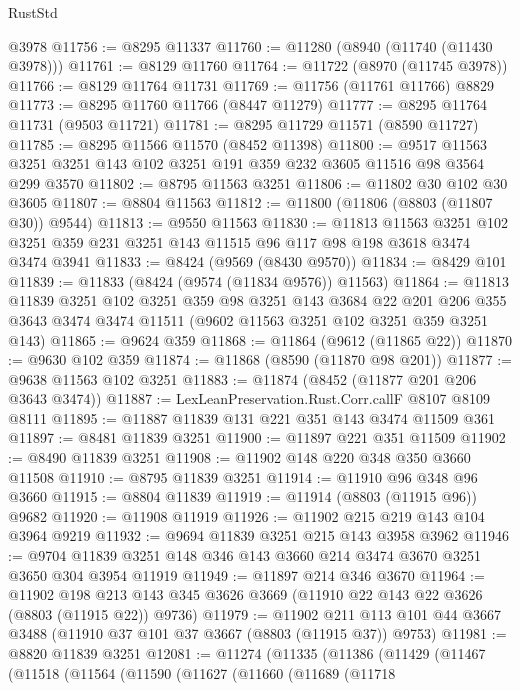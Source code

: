 \begin{lexlean}{RustStd}
\begin{coremodule}
    @3978
@11756 := @8295 @11337
@11760 := @11280 (@8940 (@11740 (@11430 @3978)))
@11761 := @8129 @11760
@11764 := @11722 (@8970 (@11745 @3978))
@11766 := @8129 @11764 @11731
@11769 := @11756 (@11761 @11766) @8829
@11773 := @8295 @11760 @11766 (@8447 @11279)
@11777 := @8295 @11764 @11731 (@9503 @11721)
@11781 := @8295 @11729 @11571 (@8590 @11727)
@11785 := @8295 @11566 @11570 (@8452 @11398)
@11800 := @9517 @11563 @3251 @3251 @143 @102 @3251 @191 @359 @232 @3605 @11516 @98 @3564 @299 @3570
@11802 := @8795 @11563 @3251
@11806 := @11802 @30 @102 @30 @3605
@11807 := @8804 @11563
@11812 := @11800 (@11806 (@8803 (@11807 @30)) @9544)
@11813 := @9550 @11563
@11830 := @11813
    @11563
    @3251
    @102
    @3251
    @359
    @231
    @3251
    @143
    @11515
    @96
    @117
    @98
    @198
    @3618
    @3474
    @3474
    @3941
@11833 := @8424 (@9569 (@8430 @9570))
@11834 := @8429 @101
@11839 := @11833 (@8424 (@9574 (@11834 @9576)) @11563)
@11864 := @11813
    @11839
    @3251
    @102
    @3251
    @359
    @98
    @3251
    @143
    @3684
    @22
    @201
    @206
    @355
    @3643
    @3474
    @3474
    @11511
    (@9602 @11563 @3251 @102 @3251 @359 @3251 @143)
@11865 := @9624 @359
@11868 := @11864 (@9612 (@11865 @22))
@11870 := @9630 @102 @359
@11874 := @11868 (@8590 (@11870 @98 @201))
@11877 := @9638 @11563 @102 @3251
@11883 := @11874 (@8452 (@11877 @201 @206 @3643 @3474))
@11887 := LexLeanPreservation.Rust.Corr.callF @8107 @8109 @8111
@11895 := @11887 @11839 @131 @221 @351 @143 @3474 @11509 @361
@11897 := @8481 @11839 @3251
@11900 := @11897 @221 @351 @11509
@11902 := @8490 @11839 @3251
@11908 := @11902 @148 @220 @348 @350 @3660 @11508
@11910 := @8795 @11839 @3251
@11914 := @11910 @96 @348 @96 @3660
@11915 := @8804 @11839
@11919 := @11914 (@8803 (@11915 @96)) @9682
@11920 := @11908 @11919
@11926 := @11902 @215 @219 @143 @104 @3964 @9219
@11932 := @9694 @11839 @3251 @215 @143 @3958 @3962
@11946 := @9704 @11839 @3251 @148 @346 @143 @3660 @214 @3474 @3670 @3251 @3650 @304 @3954 @11919
@11949 := @11897 @214 @346 @3670
@11964 := @11902
    @198
    @213
    @143
    @345
    @3626
    @3669
    (@11910 @22 @143 @22 @3626 (@8803 (@11915 @22)) @9736)
@11979 := @11902
    @211
    @113
    @101
    @44
    @3667
    @3488
    (@11910 @37 @101 @37 @3667 (@8803 (@11915 @37)) @9753)
@11981 := @8820 @11839 @3251
@12081 := @11274
    (@11335
      (@11386
        (@11429
          (@11467
            (@11518
              (@11564
                (@11590
                  (@11627
                    (@11660
                      (@11689
                        (@11718

\end{coremodule}
\end{lexlean}
